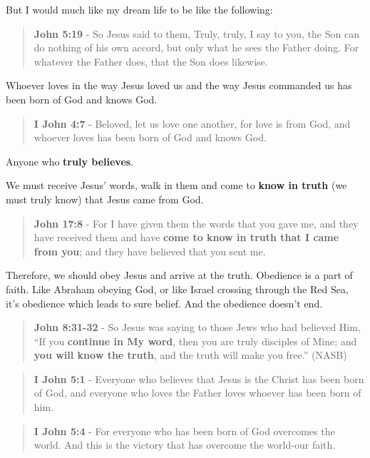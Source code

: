 \documentclass[11pt]{article}
\begin{document}
But I would much like my dream life to be like the following:

\begin{quote}
\textbf{John 5:19} - So Jesus said to them, Truly, truly, I say to you, the Son can do nothing of his own accord, but only what he sees the Father doing. For whatever the Father does, that the Son does likewise.
\end{quote}

Whoever loves in the way Jesus loved us and the way Jesus commanded us has been born of God and knows God.

\begin{quote}
\textbf{I John 4:7} - Beloved, let us love one another, for love is from God, and whoever loves has been born of God and knows God.
\end{quote}

Anyone who \textbf{truly believes}.

We must receive Jesus' words, walk in them and come to \textbf{know in truth} (we must truly know) that Jesus came from God.

\begin{quote}
\textbf{John 17:8} - For I have given them the words that you gave me, and they have received them and have \textbf{come to know in truth that I came from you}; and they have believed that you sent me.
\end{quote}

Therefore, we should obey Jesus and arrive at the truth. Obedience is a part of faith. Like Abraham obeying God, or like Israel crossing through the Red Sea, it's obedience which leads to sure belief.
And the obedience doesn't end.

\begin{quote}
\textbf{John 8:31-32} - So Jesus was saying to those Jews who had believed Him, “If you \textbf{continue in My word}, then you are truly disciples of Mine; and \textbf{you will know the truth}, and the truth will make you free.” (NASB)
\end{quote}

\begin{quote}
\textbf{I John 5:1} - Everyone who believes that Jesus is the Christ has been born of God, and everyone who loves the Father loves whoever has been born of him.
\end{quote}

\begin{quote}
\textbf{I John 5:4} - For everyone who has been born of God overcomes the world. And this is the victory that has overcome the world-our faith.
\end{quote}
\end{document}

